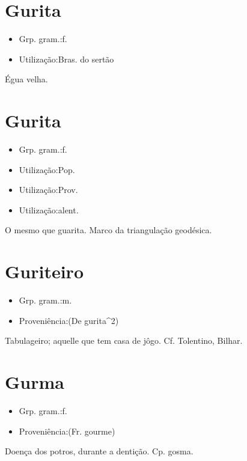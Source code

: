 \section{Gurita}
\begin{itemize}
\item {Grp. gram.:f.}
\end{itemize}
\begin{itemize}
\item {Utilização:Bras. do sertão}
\end{itemize}
Égua velha.
\section{Gurita}
\begin{itemize}
\item {Grp. gram.:f.}
\end{itemize}
\begin{itemize}
\item {Utilização:Pop.}
\end{itemize}
\begin{itemize}
\item {Utilização:Prov.}
\end{itemize}
\begin{itemize}
\item {Utilização:alent.}
\end{itemize}
O mesmo que \textunderscore guarita\textunderscore .
Marco da triangulação geodésica.
\section{Guriteiro}
\begin{itemize}
\item {Grp. gram.:m.}
\end{itemize}
\begin{itemize}
\item {Proveniência:(De \textunderscore gurita\textunderscore ^2)}
\end{itemize}
Tabulageiro; aquelle que tem casa de jôgo. Cf. Tolentino, \textunderscore Bilhar\textunderscore .
\section{Gurma}
\begin{itemize}
\item {Grp. gram.:f.}
\end{itemize}
\begin{itemize}
\item {Proveniência:(Fr. \textunderscore gourme\textunderscore )}
\end{itemize}
Doença dos potros, durante a dentição. Cp. \textunderscore gosma\textunderscore .
